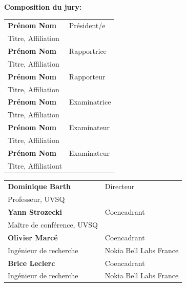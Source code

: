 \begin{titlepage}
\flushleft \small \textbf{Composition du jury:}
\bigskip



\scriptsize
\begin{tabular}{|p{8cm}l}
\arrayrulecolor{Prune}
\textbf{Prénom Nom} &   Président/e\\ 
Titre, Affiliation & \\
\textbf{Prénom Nom} &  Rapportrice \\ 
Titre, Affiliation   &   \\ 
\textbf{Prénom Nom} &  Rapporteur \\ 
Titre, Affiliation  &   \\ 
\textbf{Prénom Nom} &  Examinatrice \\ 
Titre, Affiliation   &   \\ 
\textbf{Prénom Nom} &  Examinateur \\ 
Titre, Affiliation   &   \\ 
\textbf{Prénom Nom} &  Examinateur \\ 
Titre, Affiliationt   &   \\ 

\end{tabular} 

\medskip
\begin{tabular}{|p{8cm}l}\arrayrulecolor{white}
\textbf{Dominique Barth} &   Directeur\\ 
Professeur, UVSQ & \\
\textbf{Yann Strozecki} &   Coencadrant\\ 
Maître de conférence, UVSQ  &   \\ 
\textbf{Olivier Marcé} &  Coencadrant \\ 
Ingénieur de recherche  & Nokia Bell Labs France  \\ 
\textbf{Brice Leclerc} &  Coencadrant \\ 
Ingénieur de recherche  & Nokia Bell Labs France  \\ 

\end{tabular} 


\end{titlepage}
\ifthispageodd{\newpage\thispagestyle{empty}\null\newpage}{}
\thispagestyle{empty}
\selectfont

\lhead{}
\rhead{}
\rfoot{}
\cfoot{}
\lfoot{}

